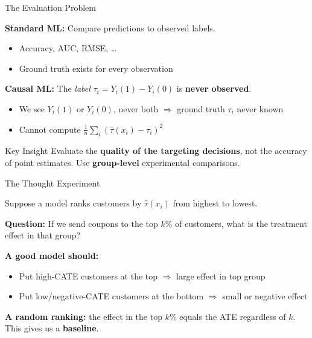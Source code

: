 \documentclass[aspectratio=169, 11pt]{beamer}
\begin{document}
\begin{frame}{The Evaluation Problem}
 
\textbf{Standard ML:} Compare predictions to observed labels.
\begin{itemize}
    \item Accuracy, AUC, RMSE, \ldots
    \item Ground truth exists for every observation
\end{itemize}
 
\bigskip
 
\textbf{Causal ML:} The \emph{label} $\tau_i = Y_i(1) - Y_i(0)$ is \textbf{never observed}.
 
\begin{itemize}
    \item We see $Y_i(1)$ or $Y_i(0)$, never both $\Longrightarrow$ ground truth $\tau_i$ never known
    \item Cannot compute $\frac{1}{n}\sum_i (\hat{\tau}(x_i) - \tau_i)^2$
\end{itemize}
 
\bigskip
 
\begin{alertblock}{Key Insight}
Evaluate the \textbf{quality of the targeting decisions}, not the accuracy of point estimates. Use \textbf{group-level} experimental comparisons.
\end{alertblock}
\end{frame}
 
\begin{frame}{The Thought Experiment}
 
Suppose a model ranks customers by $\hat{\tau}(x_i)$ from highest to lowest.
 
\bigskip
 
\textbf{Question:} If we send coupons to the top $k\%$ of customers, what is the treatment effect in that group?
 
\bigskip
 
\textbf{A good model should:}
\begin{itemize}
    \item Put high-CATE customers at the top $\Rightarrow$ large effect in top group
    \item Put low/negative-CATE customers at the bottom $\Rightarrow$ small or negative effect
\end{itemize}
 
\bigskip
 
\textbf{A random ranking:} the effect in the top $k\%$ equals the ATE regardless of $k$. This gives us a \textbf{baseline}.
\end{frame}
 
\end{document}
